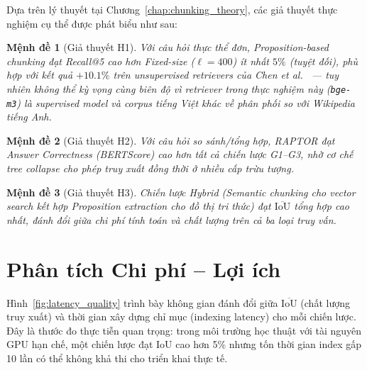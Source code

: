 \documentclass[12pt,a4paper]{report}
\theoremstyle{plain}
\newtheorem{menh}{Mệnh đề}[chapter]
\theoremstyle{definition}
\begin{document}
	Dựa trên lý thuyết tại Chương~\ref{chap:chunking_theory}, các giả thuyết
	thực nghiệm cụ thể được phát biểu như sau:
	
	\begin{menh}[Giả thuyết H1]
		Với câu hỏi thực thể đơn, Proposition-based chunking đạt Recall@5 cao hơn
		Fixed-size ($\ell = 400$) ít nhất $5\%$ (tuyệt đối), phù hợp với kết quả
		$+10.1\%$ trên unsupervised retrievers của Chen et al.~\cite{chen2024dense}
		--- tuy nhiên không thể kỳ vọng cùng biên độ vì retriever trong thực
		nghiệm này (\texttt{bge-m3}) là supervised model và corpus tiếng Việt khác
		về phân phối so với Wikipedia tiếng Anh.
	\end{menh}
	
	\begin{menh}[Giả thuyết H2]
		Với câu hỏi so sánh/tổng hợp, RAPTOR đạt Answer Correctness (BERTScore)
		cao hơn tất cả chiến lược G1--G3, nhờ cơ chế tree collapse cho phép truy
		xuất đồng thời ở nhiều cấp trừu tượng.
	\end{menh}
	
	\begin{menh}[Giả thuyết H3]
		Chiến lược Hybrid (Semantic chunking cho vector search kết hợp Proposition
		extraction cho đồ thị tri thức) đạt $\overline{\text{IoU}}$ tổng hợp cao
		nhất, đánh đổi giữa chi phí tính toán và chất lượng trên cả ba loại truy
		vấn.
	\end{menh}
	
	\section{Phân tích Chi phí -- Lợi ích}
	\label{sec:cost_benefit}
	
	Hình~\ref{fig:latency_quality} trình bày không gian đánh đổi giữa
	$\overline{\text{IoU}}$ (chất lượng truy xuất) và thời gian xây dựng chỉ
	mục (indexing latency) cho mỗi chiến lược. Đây là thước đo thực tiễn quan
	trọng: trong môi trường học thuật với tài nguyên GPU hạn chế, một chiến
	lược đạt IoU cao hơn 5\% nhưng tốn thời gian index gấp 10 lần có thể không
	khả thi cho triển khai thực tế.
	
\end{document}
